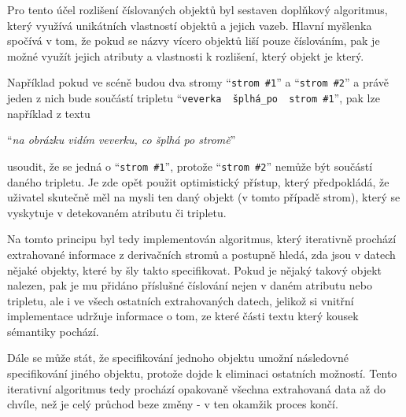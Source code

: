 Pro tento účel rozlišení číslovaných objektů byl sestaven doplňkový algoritmus,
který využívá unikátních vlastností objektů a jejich vazeb.
Hlavní myšlenka spočívá v tom, že pokud se názvy vícero objektů liší pouze číslováním,
pak je možné využít jejich atributy a vlastnosti k rozlišení, který objekt je který.

Například pokud ve scéně budou dva stromy \enquote{\texttt{strom \#1}} a \enquote{\texttt{strom \#2}} a právě jeden z nich
bude součástí tripletu \enquote{\texttt{veverka \to\ šplhá\_po \to\ strom \#1}}, pak lze například z textu
\begin{center}
	\enquote{\emph{na obrázku vidím veverku, co šplhá po stromě}}
\end{center}
usoudit, že se jedná o \enquote{\texttt{strom \#1}}, protože \enquote{\texttt{strom \#2}} nemůže být součástí daného tripletu.
Je zde opět použit optimistický přístup, který předpokládá, že uživatel skutečně měl na mysli ten daný objekt (v tomto případě strom),
který se vyskytuje v detekovaném atributu či tripletu.

Na tomto principu byl tedy implementován algoritmus, který iterativně prochází extrahované informace z derivačních stromů
a postupně hledá, zda jsou v datech nějaké objekty, které by šly takto specifikovat.
Pokud je nějaký takový objekt nalezen, pak je mu přidáno příslušné číslování nejen v daném atributu nebo tripletu,
ale i ve všech ostatních extrahovaných datech, jelikož si vnitřní implementace udržuje informace o tom,
ze které části textu který kousek sémantiky pochází.

Dále se může stát, že specifikování jednoho objektu umožní následovné specifikování jiného objektu, protože dojde k eliminaci ostatních možností.
Tento iterativní algoritmus tedy prochází opakovaně všechna extrahovaná data až do chvíle,
než je celý průchod beze změny - v ten okamžik proces končí.
